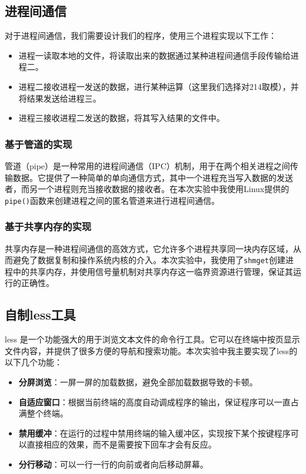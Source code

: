 \documentclass[lang=cn,a4paper,newtx]{elegantpaper}
\begin{document}
\subsection{进程间通信}
对于进程间通信，我们需要设计我们的程序，使用三个进程实现以下工作：
\begin{itemize}
    \item 进程一读取本地的文件，将读取出来的数据通过某种进程间通信手段传输给进程二。
    \item 进程二接收进程一发送的数据，进行某种运算（这里我们选择对214取模），并将结果发送给进程三。
    \item 进程三接收进程二发送的数据，将其写入结果的文件中。
\end{itemize}

\subsubsection{基于管道的实现}


管道（pipe）是一种常用的进程间通信（IPC）机制，用于在两个相关进程之间传输数据。它提供了一种简单的单向通信方式，其中一个进程充当写入数据的发送者，而另一个进程则充当接收数据的接收者。在本次实验中我使用Linux提供的\verb|pipe()|函数来创建进程之间的匿名管道来进行进程间通信。


\subsubsection{基于共享内存的实现}

共享内存是一种进程间通信的高效方式，它允许多个进程共享同一块内存区域，从而避免了数据复制和操作系统内核的介入。本次实验中，我使用了\verb|shmget|创建进程中的共享内存，并使用信号量机制对共享内存这一临界资源进行管理，保证其运行的正确性。

\subsection{自制less工具}

less 是一个功能强大的用于浏览文本文件的命令行工具。它可以在终端中按页显示文件内容，并提供了很多方便的导航和搜索功能。本次实验中我主要实现了less的以下几个功能：
\begin{itemize}
    \item \textbf{分屏浏览}：一屏一屏的加载数据，避免全部加载数据导致的卡顿。
    \item \textbf{自适应窗口}：根据当前终端的高度自动调成程序的输出，保证程序可以一直占满整个终端。
    \item \textbf{禁用缓冲}：在运行的过程中禁用终端的输入缓冲区，实现按下某个按键程序可以直接相应的效果，而不是需要按下回车才会有反应。
    \item \textbf{分行移动}：可以一行一行的向前或者向后移动屏幕。
\end{itemize}
\end{document}
